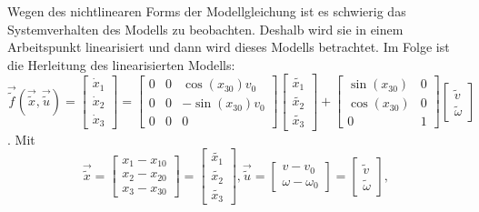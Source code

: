 Wegen des nichtlinearen Forms der Modellgleichung ist es schwierig das Systemverhalten des Modells zu beobachten. Deshalb wird sie in einem Arbeitspunkt linearisiert und dann wird dieses Modells betrachtet. Im Folge ist die Herleitung des linearisierten Modells:
\begin{equation}
    \overrightarrow{\widetilde{f}}(\overrightarrow{\widetilde{x}}, \overrightarrow{\widetilde{u}}) =
    \begin{bmatrix*}
        \dot{x}_1 \\
        \dot{x}_2 \\
        \dot{x}_3
    \end{bmatrix*}
    =
    \begin{bmatrix*}
        0 & 0 & \cos(x_{30})v_0 \\
        0 & 0 & -\sin(x_{30})v_0 \\
        0 & 0 & 0
    \end{bmatrix*}
    \begin{bmatrix*}
        \widetilde{x_1} \\
        \widetilde{x_2} \\
        \widetilde{x_3} 
    \end{bmatrix*}
    +
    \begin{bmatrix*}
        \sin(x_{30}) & 0 \\
        \cos(x_{30}) & 0 \\
        0 & 1
    \end{bmatrix*}
    \begin{bmatrix*}
        \widetilde{v} \\
        \widetilde{\omega}
    \end{bmatrix*}
\end{equation}.
Mit
\begin{equation*}
    \overrightarrow{\widetilde{x}} =
    \begin{bmatrix*} 
        x_1 - x_{10} \\
        x_2 - x_{20} \\
        x_3 - x_{30} 
    \end{bmatrix*}
    =
    \begin{bmatrix*} 
        \widetilde{x_1} \\
        \widetilde{x_2} \\
        \widetilde{x_3} 
    \end{bmatrix*},
    \overrightarrow{\widetilde{u}} =
    \begin{bmatrix*}
        v - v_0\\
        \omega - \omega_0
    \end{bmatrix*}
    =
    \begin{bmatrix*}
        \widetilde{v} \\
        \widetilde{\omega}
    \end{bmatrix*},
\end{equation*}

